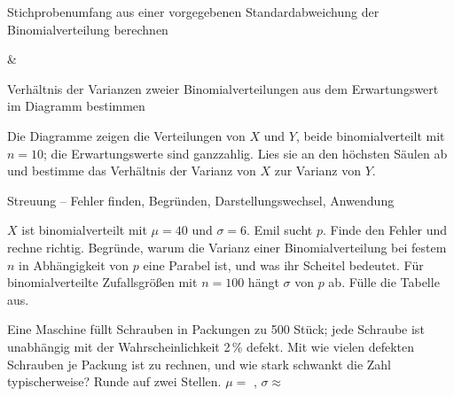 \begin{aufgabe}{Stichprobenumfang aus einer vorgegebenen Standardabweichung der Binomialverteilung berechnen}
\begin{gleichungsraster}[2]
 & \\
\end{gleichungsraster}
\end{aufgabe}

\begin{aufgabe}{Verhältnis der Varianzen zweier Binomialverteilungen aus dem Erwartungswert im Diagramm bestimmen}
\begin{teile}
\teil Die Diagramme zeigen die Verteilungen von $X$ und $Y$, beide binomialverteilt mit $n = 10$; die Erwartungswerte sind ganzzahlig. Lies sie an den höchsten Säulen ab und bestimme das Verhältnis der Varianz von $X$ zur Varianz von $Y$.

 
\leerfeld
\end{teile}
\end{aufgabe}

\begin{aufgabe}{Streuung – Fehler finden, Begründen, Darstellungswechsel, Anwendung}
\begin{teile}
\teil $X$ ist binomialverteilt mit $\mu = 40$ und $\sigma = 6$. Emil sucht $p$. Finde den Fehler und rechne richtig. 
\teil Begründe, warum die Varianz einer Binomialverteilung bei festem $n$ in Abhängigkeit von $p$ eine Parabel ist, und was ihr Scheitel bedeutet.
\teil Für binomialverteilte Zufallsgrößen mit $n = 100$ hängt $\sigma$ von $p$ ab. Fülle die Tabelle aus.

\teil Eine Maschine füllt Schrauben in Packungen zu 500 Stück; jede Schraube ist unabhängig mit der Wahrscheinlichkeit 2\,\% defekt. Mit wie vielen defekten Schrauben je Packung ist zu rechnen, und wie stark schwankt die Zahl typischerweise? Runde auf zwei Stellen. $\mu = $ \leerfeld , $\sigma \approx $ \leerfeld
\end{teile}
\end{aufgabe}
